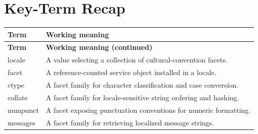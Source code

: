 \documentclass[11pt,letterpaper]{article}
\begin{document}
\section{Key-Term Recap}
\begin{longtable}{@{}>{\RaggedRight\arraybackslash}p{}>{\RaggedRight\arraybackslash}p{}@{}}\toprule\textbf{Term} & \textbf{Working meaning}\\\midrule\endfirsthead\toprule\textbf{Term} & \textbf{Working meaning (continued)}\\\midrule\endhead\bottomrule\endfoot
locale & A value selecting a collection of cultural-convention facets.\\
facet & A reference-counted service object installed in a locale.\\
ctype & A facet family for character classification and case conversion.\\
collate & A facet family for locale-sensitive string ordering and hashing.\\
numpunct & A facet exposing punctuation conventions for numeric formatting.\\
messages & A facet family for retrieving localized message strings.\\
\end{longtable}
\end{document}
